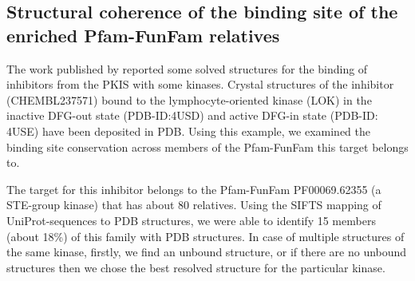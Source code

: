 \documentclass[a4paper, 11pt]{article}
\begin{document}
\subsection*{Structural coherence of the binding site of the enriched Pfam-FunFam relatives}
The work published by \cite{elkins2016comprehensive} reported some solved structures for the binding of inhibitors from the PKIS with some kinases. Crystal structures of the inhibitor (CHEMBL237571) bound to the lymphocyte-oriented kinase (LOK) in the inactive DFG-out state (PDB-ID:4USD) and active DFG-in state (PDB-ID: 4USE) have been deposited in PDB. Using this example, we examined the binding site conservation across members of the Pfam-FunFam this target belongs to.\par
The target for this inhibitor belongs to the Pfam-FunFam PF00069.62355 (a STE-group kinase) that has about 80 relatives. Using the SIFTS mapping of UniProt-sequences to PDB structures, we were able to identify 15 members (about 18\%) of this family with PDB structures. In case of multiple structures of the same kinase, firstly, we find an unbound structure, or if there are no unbound structures then we chose the best resolved structure for the particular kinase.\\
\end{document}

